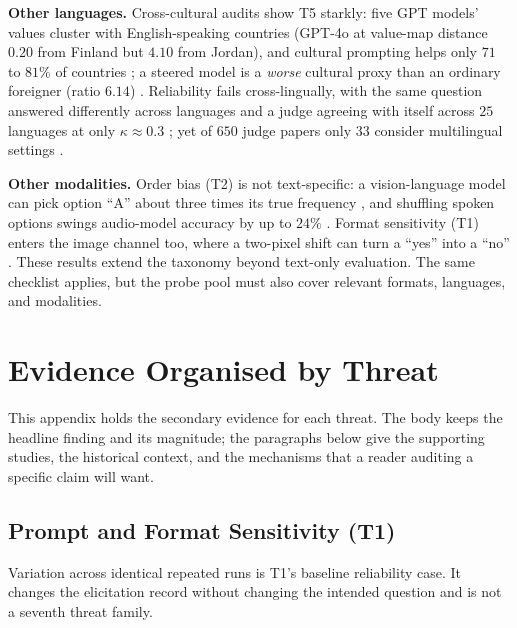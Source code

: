 \documentclass[11pt]{article}
\begin{document}
\textbf{Other languages.} Cross-cultural audits show T5 starkly: five GPT
models' values cluster with English-speaking countries (GPT-4o at value-map
distance $0.20$ from Finland but $4.10$ from Jordan), and cultural prompting
helps only $71$ to $81\%$ of countries \cite{tao2024cultural}; a steered model
is a \emph{worse} cultural proxy than an ordinary foreigner (ratio $6.14$)
\cite{khan2025randomness}. Reliability fails cross-lingually, with the same
question answered differently across languages \cite{lim2025languagespecific}
and a judge agreeing with itself across $25$ languages at only $\kappa\approx0.3$
\cite{fu2025reliable}; yet of $650$ judge papers only $33$ consider
multilingual settings \cite{dogruoz2026challenges}.

\textbf{Other modalities.} Order bias (T2) is not text-specific: a
vision-language model can pick option ``A'' about three times its true frequency
\cite{atabuzzaman2025mcqa}, and shuffling spoken options swings audio-model
accuracy by up to $24\%$ \cite{lin2025hearing}. Format sensitivity (T1) enters
the image channel too, where a two-pixel shift can turn a ``yes'' into a ``no''
\cite{rosenfeld2025questioning}. These results extend the taxonomy beyond
text-only evaluation. The same checklist applies, but the probe pool must also
cover relevant formats, languages, and modalities.

\section{Evidence Organised by Threat}
\label{app:tierext}

This appendix holds the secondary evidence for each threat. The body keeps the headline finding and its magnitude; the paragraphs below give the supporting studies, the historical context, and the mechanisms that a reader auditing a specific claim will want.

\subsection{Prompt and Format Sensitivity (T1)}
\label{app:t1evidence}

Variation across identical repeated runs is T1's baseline reliability case. It
changes the elicitation record without changing the intended question and is
not a seventh threat family.
\end{document}
